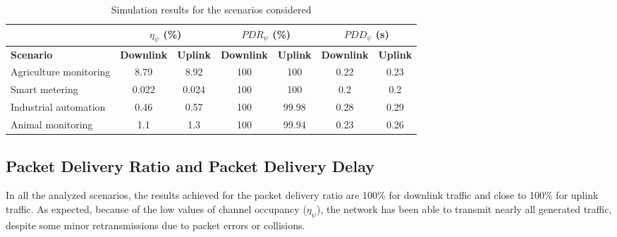 \documentclass[]{article}
\begin{document}
\renewcommand\thetable{3}
\setcounter{table}{2} 
\begin{table}[h!]
\begin{center}
\begin{tabular}{|l|c|c|c|c|c|c|}
\hline
 & \multicolumn{2}{|c|}{\textbf{$\eta_{\psi}$} (\%)} & \multicolumn{2}{|c|}{\textbf{$PDR_{\psi}$} (\%)} & \multicolumn{2}{|c|}{\textbf{$PDD_{\psi}$} (s)}\\
\hline 
\textbf{Scenario} & \textbf{Downlink} & \textbf{Uplink} & \textbf{Downlink} & \textbf{Uplink} & \textbf{Downlink} & \textbf{Uplink}\\
\hline
Agriculture monitoring & 8.79 & 8.92 & 100 & 100 & 0.22 & 0.23 \\
\hline
Smart metering & 0.022 & 0.024 & 100 & 100 & 0.2 & 0.2\\
\hline
Industrial automation & 0.46 & 0.57 & 100 & 99.98 & 0.28 & 0.29\\
\hline
Animal monitoring & 1.1 & 1.3 & 100 & 99.94 & 0.23 & 0.26\\
\hline
\end{tabular}
\vspace{-0.3cm}
\end{center}
\caption{Simulation results for the scenarios considered}
\label{table:occupancy}
\end{table}

\subsection{Packet Delivery Ratio and Packet Delivery Delay}

In all the analyzed scenarios, the results achieved for the packet delivery ratio are 100\% for downlink traffic and close to 100\% for uplink traffic. As expected, because of the low values of channel occupancy ($\eta_{\psi}$), the network has been able to transmit nearly all generated traffic, despite some minor retransmissions due to packet errors or collisions.  
\end{document}
